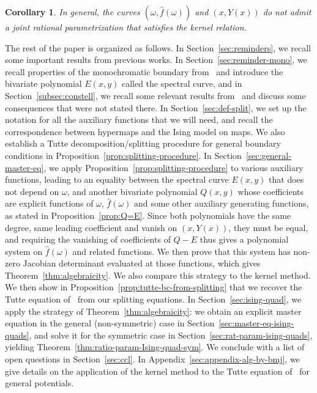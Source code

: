 \documentclass{scrartcl}
\newcommand\wh[1]{\widehat{#1}}
\newtheorem{cor}[thm]{Corollary}
\begin{document}
\begin{cor}
\label{cor:non-co-rat}
In general, the curves $(\omega,\widehat{f}(\omega))$ and $(x,Y(x))$ do not admit a joint rational parametrization that satisfies the kernel relation.
\end{cor}

The rest of the paper is organized as follows. In Section~\ref{sec:reminders}, we recall some important results from previous works. In Section~\ref{sec:reminder-mono}, we recall properties of the monochromatic boundary from~\cite{eynard} and introduce the bivariate polynomial $E(x,y)$ called the spectral curve, and in Section~\ref{subsec:constell}, we recall some relevant results from~\cite{bouttier-carrance} and discuss some consequences that were not stated there. In Section~\ref{sec:def-split}, we set up the notation for all the auxiliary functions that we will need, and recall the correspondence between hypermaps and the Ising model on maps. We also establish a Tutte decomposition/splitting procedure for general boundary conditions in Proposition~\ref{prop:splitting-procedure}. In Section~\ref{sec:general-master-eq}, we apply Proposition~\ref{prop:splitting-procedure} to various auxiliary functions, leading to an equality between the spectral curve $E(x,y)$ that does not depend on $\omega$, and another bivariate polynomial $Q(x,y)$ whose coefficients are explicit functions of $\omega$, $\wh{f}(\omega)$ and some other auxiliary generating functions, as stated in Proposition~\ref{prop:Q=E}. Since both polynomials have the same degree, same leading coefficient and vanish on $(x,Y(x))$, they must be equal, and requiring the vanishing of coefficients of $Q-E$ thus gives a polynomial system on $\wh{f}(\omega)$ and related functions. We then prove that this system has non-zero Jacobian determinant evaluated at those functions, which gives Theorem~\ref{thm:algebraicity}. We also compare this strategy to the kernel method. We then show in Proposition~\ref{prop:tutte-bc-from-splitting} that we recover the Tutte equation of~\cite{bouttier-carrance} from our splitting equations. In Section~\ref{sec:ising-quad}, we apply the strategy of Theorem~\ref{thm:algebraicity}: we obtain an explicit master equation in the general (non-symmetric) case in Section~\ref{sec:master-eq-ising-quads}, and solve it for the symmetric case in Section~\ref{sec:rat-param-ising-quads}, yielding Theorem~\ref{thm:ratio-param-Ising-quad-sym}. We conclude with a list of open questions in Section~\ref{sec:ccl}. In Appendix~\ref{sec:appendix-alg-by-bmj}, we give details on the application of the kernel method to the Tutte equation of~\cite{bouttier-carrance} for general potentials.
\end{document}
